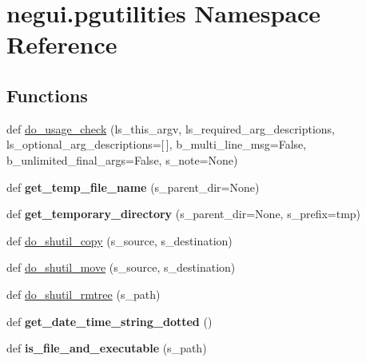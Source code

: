 \hypertarget{namespacenegui_1_1pgutilities}{}\section{negui.\+pgutilities Namespace Reference}
\label{namespacenegui_1_1pgutilities}
\subsection*{Functions}
\begin{DoxyCompactItemize}
\item 
def \hyperlink{namespacenegui_1_1pgutilities_a20a66168135d35b6713e38b2503f6289}{do\+\_\+usage\+\_\+check} (ls\+\_\+this\+\_\+argv, ls\+\_\+required\+\_\+arg\+\_\+descriptions, ls\+\_\+optional\+\_\+arg\+\_\+descriptions=\mbox{[}$\,$\mbox{]}, b\+\_\+multi\+\_\+line\+\_\+msg=False, b\+\_\+unlimited\+\_\+final\+\_\+args=False, s\+\_\+note=None)
\item 
def {\bfseries get\+\_\+temp\+\_\+file\+\_\+name} (s\+\_\+parent\+\_\+dir=None)\hypertarget{namespacenegui_1_1pgutilities_ad6c0521426420d127727244adf340234}{}\label{namespacenegui_1_1pgutilities_ad6c0521426420d127727244adf340234}

\item 
def {\bfseries get\+\_\+temporary\+\_\+directory} (s\+\_\+parent\+\_\+dir=None, s\+\_\+prefix=\textquotesingle{}tmp\textquotesingle{})\hypertarget{namespacenegui_1_1pgutilities_a4f2bfe94577cbe04bca1afdf3c27eb64}{}\label{namespacenegui_1_1pgutilities_a4f2bfe94577cbe04bca1afdf3c27eb64}

\item 
def \hyperlink{namespacenegui_1_1pgutilities_a181f06e4657dd5c32806cca223f0eb4e}{do\+\_\+shutil\+\_\+copy} (s\+\_\+source, s\+\_\+destination)
\item 
def \hyperlink{namespacenegui_1_1pgutilities_a954873cfc5c675dc2e94e17931965ced}{do\+\_\+shutil\+\_\+move} (s\+\_\+source, s\+\_\+destination)
\item 
def \hyperlink{namespacenegui_1_1pgutilities_a75466ab2a233a7cb270ca769a37e5c66}{do\+\_\+shutil\+\_\+rmtree} (s\+\_\+path)
\item 
def {\bfseries get\+\_\+date\+\_\+time\+\_\+string\+\_\+dotted} ()\hypertarget{namespacenegui_1_1pgutilities_a926d8ee0bffed0d961dcfc3d169e05a4}{}\label{namespacenegui_1_1pgutilities_a926d8ee0bffed0d961dcfc3d169e05a4}

\item 
def {\bfseries is\+\_\+file\+\_\+and\+\_\+executable} (s\+\_\+path)\hypertarget{namespacenegui_1_1pgutilities_a8a347fe70cfaae23658adb58cd312e93}{}\label{namespacenegui_1_1pgutilities_a8a347fe70cfaae23658adb58cd312e93}


\end{DoxyCompactItemize}
